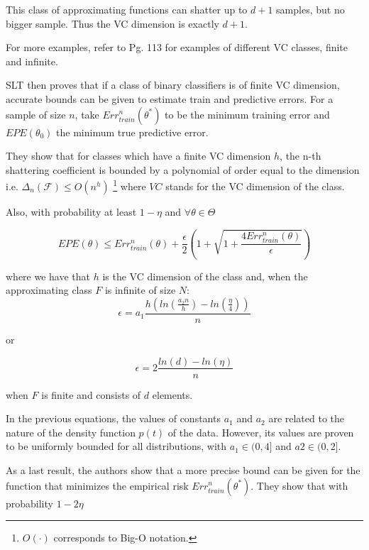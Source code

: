 This class of approximating functions can shatter up to $d+1$ samples, but no bigger sample. Thus the VC dimension is exactly $d+1$.

For more examples, refer to \textcite{cherkassky-learning2007} Pg. 113 for examples of different VC classes, finite and infinite.

SLT then proves that if a class of binary classifiers is of finite VC dimension, accurate bounds can be given to estimate train and predictive errors. For a sample of size $n$, take $Err^n_{train}(\theta^*)$ to be the minimum training error and $EPE(\theta_0)$ the minimum true predictive error.

They show that for classes which have a finite VC dimension $h$, the n-th shattering coefficient is bounded by a polynomial of order equal to the dimension
i.e. $\Delta_n(\mathcal {F}) \leq O(n^{h})$ \footnote{$O(\cdot)$ corresponds to Big-O notation.} where $VC$ stands for the VC dimension of the class.

Also, with probability at least $1 - \eta$ and $\forall \theta \in \Theta$

\begin{equation}\label{vapnik-classificationBound}
EPE(\theta) \leq  Err^n_{train}(\theta) + \frac{\epsilon}{2} \left(1 + \sqrt{1 + \frac{4 Err^n_{train}(\theta)  }{\epsilon}}  \right)
\end{equation}

where we have that $h$ is the VC dimension of the class and, when the approximating class $F$ is infinite of size $N$:
\begin{equation}\label{vapnik-epsilonBound}
\epsilon = a_1 \frac{h \left( ln(\frac{a_2 n}{h} ) -  ln(\frac{\eta}{4} ) \right)}{n}
\end{equation}

or

\begin{equation}\label{vapnik-epsilonBound}
\epsilon = 2 \frac{ ln(d) - ln(\eta)}{n}
\end{equation}

when $F$ is finite and consists of $d$ elements.

In the previous equations, the values of constants $a_1$ and $a_2$ are related to the nature of the density function $p(t)$ of the data. However, its values are proven to be uniformly bounded for all distributions, with $a_1 \in (0,4 ]$ and $a2 \in (0,2 ]$.

As a last result, the authors show that a more precise bound can be given for the function that minimizes the empirical risk $Err^n_{train}(\theta^*)$. They show that with probability $1 - 2\eta$

